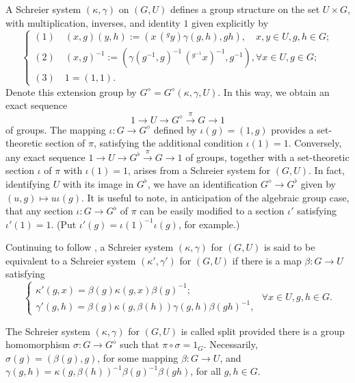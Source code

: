\documentclass[11pt,leqno,amscd,amssymb,verbatim, url]{amsart}
\theoremstyle{definition}
\numberwithin{equation}{thm}
\begin{document}
A Schreier system $(\kappa,\gamma)$ on $(G,U)$ defines a group structure on the set $U\times G$, with multiplication, inverses, and identity $1$ given explicitly by
\begin{equation}\label{groupoperations}\begin{cases}(1)\quad (x,g)(y,h):=(x\,({^{g}y})\gamma(g,h),gh),\quad x,y\in U, g,h\in G;\\
(2)\quad (x,g)^{-1} :=({\gamma(g^{-1},g)^{-1}}\,({^{g^{-1}}x})^{-1},g^{-1}),\forall x\in U,g\in G ;\\
(3)\quad 1=(1,1).\end{cases}\end{equation}
Denote this extension group by $G^\diamond=G^\diamond(\kappa,\gamma,U)$.
In this way, we obtain an exact sequence
\begin{equation}\label{shortexact}1\to U\to G^\diamond\overset\pi\to G\to 1\end{equation}
of groups. The mapping $\iota:G\to G^\diamond$ defined by $\iota(g)=(1,g)$ provides a set-theoretic section of $\pi$, satisfying
the additional condition $\iota(1)=1$.
Conversely, any exact sequence $1\to U\to G^\flat\overset\pi\to G\to 1$ of groups, together with a set-theoretic section $\iota$ of $\pi$ with $\iota(1)=1$, arises from a Schreier system for $(G,U)$. In fact, identifying $U$ with its image in $G^\flat$, we have an identification $G^\diamond\to G^\flat$ given by
$(u,g)\mapsto u\iota(g)$. It is useful to note, in anticipation of the algebraic group case, that any section $\iota:G\to G^\flat$ of $\pi$ can be easily modified to a section $\iota'$ satisfying $\iota'(1)=1$. (Put $\iota'(g)=\iota(1)^{-1}\iota(g)$,
for example.)

Continuing to follow \cite{Hall}, a Schreier system $(\kappa,\gamma)$ for $(G,U)$ is said to be equivalent to a Schreier system
$(\kappa',\gamma')$ for $(G,U)$ if there is a map $\beta:G\to U$ satisfying
$$\begin{cases} \kappa'(g,x)=\beta(g)\kappa(g,x)\beta(g)^{-1};\\
\gamma'(g,h)=\beta(g)\kappa(g,\beta(h))\gamma(g,h)\beta(gh)^{-1},\end{cases}\,\,\forall x\in U, g,h\in G.$$

The Schreier system $(\kappa,\gamma)$ for $(G,U)$ is called split provided there is a group homomorphism $\sigma:G\to G^\diamond$
such that $\pi\circ\sigma=1_G$. Necessarily, $\sigma(g)=(\beta(g),g)$, for some mapping $\beta:G\to U$, and
$\gamma(g,h)=\kappa(g,\beta(h))^{-1}\beta(g)^{-1}\beta(gh)$, for all $g,h\in G$.
\end{document}
